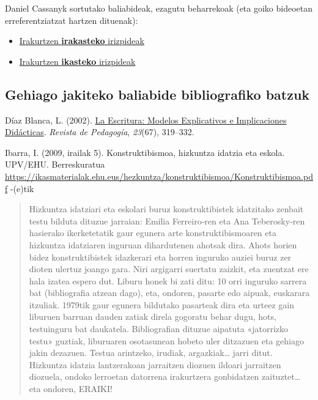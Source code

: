 \documentclass[]{book}
\providecommand{\tightlist}{%
  \setlength{\itemsep}{0pt}\setlength{\parskip}{0pt}}
\begin{document}
Daniel Cassanyk sortutako baliabideak, ezagutu beharrekoak (eta goiko bideoetan erreferentziatzat hartzen dituenak):

\begin{itemize}
\tightlist
\item
  \href{http://educalab.es/documents/235507/242734/ep_eso_prof_10clavesparaensenarainterpretar.pdf}{Irakurtzen \textbf{irakasteko} irizpideak}
\item
  \href{http://leer.es/documents/235507/353837/art_alum_ep_eso_leereradigital_10clavesparaaprenderrainterpretar_danielcassany.pdf}{Irakurtzen \textbf{ikasteko} irizpideak}
\end{itemize}

\hypertarget{gehiago-jakiteko-baliabide-bibliografiko-batzuk}{%
\subsection{Gehiago jakiteko baliabide bibliografiko batzuk}\label{gehiago-jakiteko-baliabide-bibliografiko-batzuk}}

Díaz Blanca, L. (2002). \href{http://www.scielo.org.ve/scielo.php?script=sci_arttext\&pid=S0798-97922002000200007\&lng=es\&nrm=iso}{La Escritura: Modelos Explicativos e Implicaciones Didácticas}. \emph{Revista de Pedagogía}, \emph{23}(67), 319--332.

Ibarra, I. (2009, irailak 5). Konstruktibismoa, hizkuntza idatzia eta eskola. UPV/EHU. Berreskuratua \url{https://ikasmaterialak.ehu.eus/hezkuntza/konstruktibismoa/Konstruktibismoa.pdf} -(e)tik

\begin{quote}
Hizkuntza idatziari eta eskolari buruz konstruktibistek idatzitako zenbait testu bilduta dituzue jarraian: Emilia Ferreiro‐ren eta Ana Teberosky‐ren hasierako ikerketetatik gaur egunera arte konstruktibismoaren eta hizkuntza idatziaren inguruan dihardutenen ahotsak dira. Ahots horien bidez konstruktibistek idazkerari eta horren inguruko auziei buruz zer dioten ulertuz joango gara. Niri argigarri suertatu zaizkit, eta zuentzat ere hala izatea espero dut. Liburu honek bi zati ditu: 10 orri inguruko sarrera bat (bibliografia atzean dago), eta, ondoren, pasarte edo aipuak, euskarara itzuliak. 1979tik gaur egunera bildutako pasarteak dira eta urteez gain liburuen barruan dauden zatiak direla gogoratu behar dugu, hots, testuinguru bat daukatela. Bibliografian dituzue aipatuta «jatorrizko testu» guztiak, liburuaren osotasunean hobeto uler ditzazuen eta gehiago jakin dezazuen. Testua arintzeko, irudiak, argazkiak\ldots{} jarri ditut.\\
Hizkuntza idatzia lantzerakoan jarraitzen diozuen ildoari jarraitzen diozuela, ondoko lerroetan datorrena irakurtzera gonbidatzen zaituztet\ldots{} eta ondoren, ERAIKI!
\end{quote}
\end{document}
